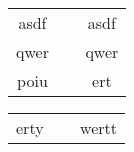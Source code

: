 \documentclass{article}
\begin{document}
\begin{tabular}{ccc}
	asdf & \hspace{5cm} & asdf\\
	qwer & $\;$ & qwer\\
	poiu & $\;$ & ert

\end{tabular}
\newpage
\begin{tabular}{ccc}
	erty & $\;$ & wertt
\end{tabular}
\end{document}
